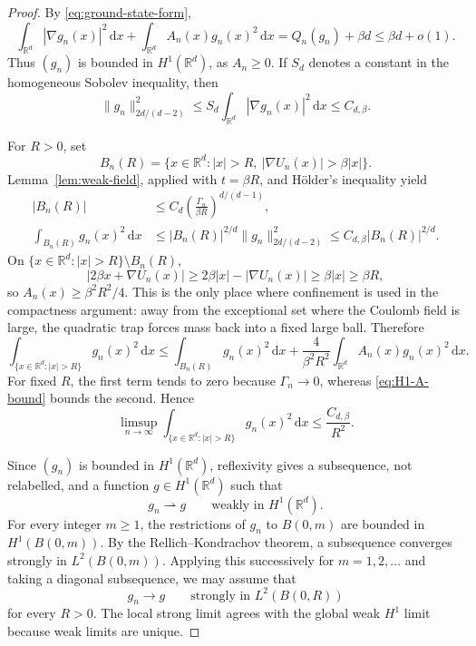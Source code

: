 \documentclass[12pt,reqno,letterpaper]{amsart}
\theoremstyle{definition}
\theoremstyle{remark}
\numberwithin{equation}{section}
\newcommand{\R}{\mathbb R}
\newcommand{\dd}{\,\mathrm d}
\newcommand{\be}{\beta}
\begin{document}
\begin{proof}
By \eqref{eq:ground-state-form},
\begin{equation}\label{eq:H1-A-bound}
 \int_{\R^d}|\nabla g_n(x)|^2\dd x+
 \int_{\R^d}A_n(x)g_n(x)^2\dd x
 =Q_n(g_n)+\be d\le\be d+o(1).
\end{equation}
Thus \((g_n)\) is bounded in \(H^1(\R^d)\), as $A_n \ge 0$.  If \(S_d\) denotes a constant
in the homogeneous Sobolev inequality, then
\[
 \|g_n\|_{2d/(d-2)}^2
 \le S_d\int_{\R^d}|\nabla g_n(x)|^2\dd x\le C_{d,\be}.
\]

For \(R>0\), set
\[
 B_n(R)=\{x\in\R^d:|x|>R,\ |\nabla U_n(x)|>\be|x|\}.
\]
Lemma~\ref{lem:weak-field}, applied with \(t=\be R\), and H\"older's
inequality yield
\begin{align*}
 |B_n(R)|
 &\le C_d\left(\frac{\Gamma_n}{\be R}\right)^{d/(d-1)},\\
 \int_{B_n(R)}g_n(x)^2\dd x
 &\le |B_n(R)|^{2/d}\|g_n\|_{2d/(d-2)}^2
 \le C_{d,\be}|B_n(R)|^{2/d}.
\end{align*}
On \(\{x\in\R^d:|x|>R\}\setminus B_n(R)\),
\[
 |2\be x+\nabla U_n(x)|
 \ge2\be|x|-|\nabla U_n(x)|
 \ge\be|x|\ge\be R,
\]
so \(A_n(x)\ge\be^2R^2/4\).  This is the only place where confinement is
used in the compactness argument: away from the exceptional set where the
Coulomb field is large, the quadratic trap forces mass back into a fixed
large ball.  Therefore
\[
 \int_{\{x\in\R^d:|x|>R\}}g_n(x)^2\dd x
 \le\int_{B_n(R)}g_n(x)^2\dd x
 +\frac4{\be^2R^2}\int_{\R^d}A_n(x)g_n(x)^2\dd x.
\]
For fixed \(R\), the first term tends to zero because \(\Gamma_n\to0\),
whereas \eqref{eq:H1-A-bound} bounds the second.  Hence
\begin{equation*}
 \limsup_{n\to\infty}
 \int_{\{x\in\R^d:|x|>R\}}g_n(x)^2\dd x
 \le\frac{C_{d,\be}}{R^2}.
\end{equation*}

Since \((g_n)\) is bounded in \(H^1(\R^d)\), reflexivity gives a
subsequence, not relabelled, and a function \(g\in H^1(\R^d)\) such that
\[
 g_n\rightharpoonup g
 \qquad\text{weakly in }H^1(\R^d).
\]
For every integer \(m\ge1\), the restrictions of \(g_n\) to \(B(0,m)\)
are bounded in \(H^1(B(0,m))\).  By the Rellich--Kondrachov theorem, a
subsequence converges strongly in \(L^2(B(0,m))\).  Applying this
successively for \(m=1,2,\ldots\) and taking a diagonal subsequence, we may
assume that
\[
 g_n\longrightarrow g
 \qquad\text{strongly in }L^2(B(0,R))
\]
for every \(R>0\).  The local strong limit agrees with the global weak
\(H^1\) limit because weak limits are unique.


\end{proof}
\end{document}
